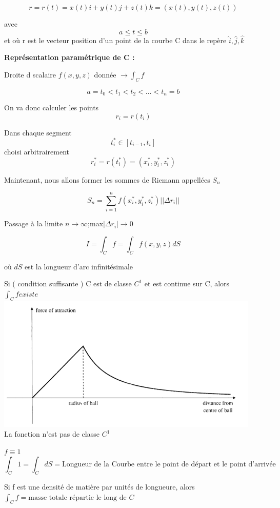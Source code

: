 \[r=r(t)=x(t)i+ y(t)j+z(t)k = (x(t),y(t),z(t))\]

avec \[a\leqslant t\leqslant b\] et où r est le vecteur position d'un point de la courbe C dans le repère ${\hat i,\hat{j}, \hat{k} }$

\textbf{Représentation paramétrique de C :}

Droite d scalaire $f(x,y,z)$ donnée $\to \int_C f$

\[a=t_0<t_1<t_2<...<t_n=b\]

On va donc calculer les points
\[r_i = r(t_i)\]

Dans chaque segment\[t_i^*\in[t_{i-1},t_i]\] choisi arbitrairement
\[r_i^*=r(t_i^*)=(x_i^*,y_i^*,z_i^*)\]

Maintenant, nous allons former les sommes de Riemann appellées $S_n$

\[S_n=\sum_{i=1}^nf(x_i^*,y_i^*,z_i^*)||\Delta r_i||\]

Passage à la limite $n\to\infty$;max$|\Delta r_i|\to 0$

\[I=\int_C f = \int_C f (x,y,z)dS\]

où $dS$ est la longueur d'arc infinitésimale

\begin{mytheo}
Si ( condition suffisante ) C est de classe $C^1$ et est continue sur C, alors $\int_Cf existe$\\
\includegraphics[scale=0.5]{exemple1.png}\\
La fonction n'est pas de classe $C^1$
\end{mytheo}

\begin{myrem}

$f\equiv1$
\[\int_C 1 = \int_C dS = \text{Longueur de la Courbe entre le point de départ et le point d'arrivée}\]
\end{myrem}

\begin{myrem}
Si f est une densité de matière par unités de longueure, alors $\int_C f  = \text{masse totale répartie le long de }C$
\end{myrem}


